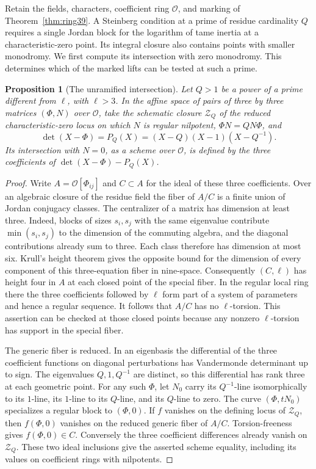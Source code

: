 \documentclass[a4paper,11pt]{article}
\newtheorem{proposition}{Proposition}[section]
\theoremstyle{definition}
\theoremstyle{remark}
\numberwithin{equation}{section}
\newcommand{\OO}{\mathcal O}
\begin{document}
Retain the fields, characters, coefficient ring \(\OO\), and marking of
Theorem~\ref{thm:ring39}. A Steinberg condition at a prime of residue
cardinality \(Q\) requires a single Jordan block for the logarithm of
tame inertia at a characteristic-zero point. Its integral closure also
contains points with smaller monodromy. We first compute its intersection
with zero monodromy. This determines which of the marked lifts can be
tested at such a prime.

\begin{proposition}[The unramified intersection]\label{prop:stintersection616}
Let \(Q>1\) be a power of a prime different from \(\ell\), with
\(\ell>3\). In the affine space of pairs of three by three matrices
\((\Phi,N)\) over \(\OO\), take the schematic closure \(\mathcal Z_Q\)
of the reduced characteristic-zero locus on which \(N\) is regular
nilpotent, \(\Phi N=QN\Phi\), and
\[
          \det(X-\Phi)=P_Q(X)=(X-Q)(X-1)(X-Q^{-1}).
\]
Its intersection with \(N=0\), as a scheme over \(\OO\), is defined by
the three coefficients of \(\det(X-\Phi)-P_Q(X)\).
\end{proposition}
\begin{proof}
Write \(A=\OO[\Phi_{ij}]\) and \(C\subset A\) for the ideal of these
three coefficients. Over an algebraic closure of the residue field the
fiber of \(A/C\) is a finite union of Jordan conjugacy classes. The
centralizer of a matrix has dimension at least three. Indeed, blocks of
sizes \(s_i,s_j\) with the same eigenvalue contribute
\(\min(s_i,s_j)\) to the dimension of the commuting algebra, and the
diagonal contributions already sum to three. Each class therefore has
dimension at most six. Krull's height theorem gives the opposite bound
for the dimension of every component of this three-equation fiber in
nine-space. Consequently \((C,\ell)\) has height four in \(A\) at each
closed point of the special fiber. In the regular local ring there the
three coefficients followed by \(\ell\) form part of a system of
parameters and hence a regular sequence. It follows that \(A/C\) has
no \(\ell\)-torsion. This assertion can be checked at those closed
points because any nonzero \(\ell\)-torsion has support in the special
fiber.

The generic fiber is reduced. In an eigenbasis the differential of
the three coefficient functions on diagonal perturbations has
Vandermonde determinant up to sign. The eigenvalues \(Q,1,Q^{-1}\)
are distinct, so this differential has rank three at each geometric
point. For any such \(\Phi\), let \(N_0\) carry its \(Q^{-1}\)-line
isomorphically to its \(1\)-line, its \(1\)-line to its \(Q\)-line,
and its \(Q\)-line to zero. The curve \((\Phi,tN_0)\) specializes a
regular block to \((\Phi,0)\).
If \(f\) vanishes on the defining locus of \(\mathcal Z_Q\), then
\(f(\Phi,0)\) vanishes on the reduced generic fiber of \(A/C\).
Torsion-freeness gives \(f(\Phi,0)\in C\). Conversely the three
coefficient differences already vanish on \(\mathcal Z_Q\).
These two ideal inclusions give the asserted scheme equality, including
its values on coefficient rings with nilpotents.
\end{proof}
\end{document}
